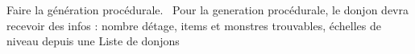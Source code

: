 
\begin{DoxyRefList}
\item[\label{todo__todo000001}%
\Hypertarget{todo__todo000001}%
Membre \mbox{\hyperlink{classDonjon_abe40dcef2369d3e84b2298b0ad019988}{Donjon\+:\+:augmenter\+Nb\+Etages\+Parcourus}} ()]Faire la génération procédurale.~\newline
Pour la generation procédurale, le donjon devra recevoir des infos \+: nombre d\textquotesingle{}étage, items et monstres trouvables, échelles de niveau depuis une Liste de donjons 
\end{DoxyRefList}